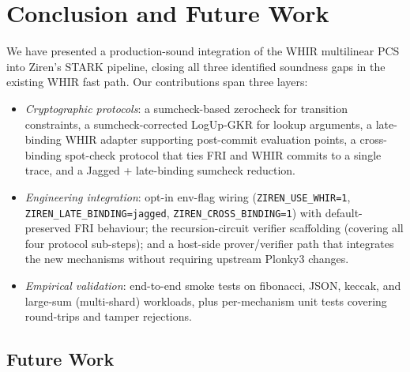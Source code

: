 \section{Conclusion and Future Work}
\label{sec:conclusion}

We have presented a production-sound integration of the WHIR
multilinear PCS into Ziren's STARK pipeline, closing all three
identified soundness gaps in the existing WHIR fast path.  Our
contributions span three layers:

\begin{itemize}
  \item \emph{Cryptographic protocols}: a sumcheck-based zerocheck
        for transition constraints, a sumcheck-corrected LogUp-GKR
        for lookup arguments, a late-binding WHIR adapter
        supporting post-commit evaluation points, a cross-binding
        spot-check protocol that ties FRI and WHIR commits to a
        single trace, and a Jagged + late-binding sumcheck reduction.

  \item \emph{Engineering integration}: opt-in env-flag wiring
        (\texttt{ZIREN\_USE\_WHIR=1},
        \texttt{ZIREN\_LATE\_BINDING=jagged},
        \texttt{ZIREN\_CROSS\_BINDING=1}) with default-preserved
        FRI behaviour; the recursion-circuit verifier scaffolding
        (covering all four protocol sub-steps); and a host-side
        prover/verifier path that integrates the new mechanisms
        without requiring upstream Plonky3 changes.

  \item \emph{Empirical validation}: end-to-end smoke tests on
        fibonacci, JSON, keccak, and large-sum (multi-shard)
        workloads, plus per-mechanism unit tests covering
        round-trips and tamper rejections.
\end{itemize}

\subsection{Future Work}

